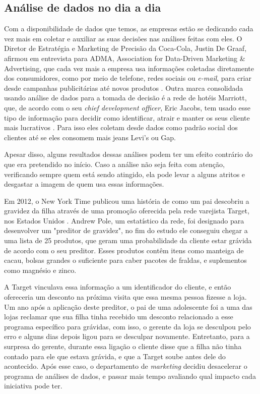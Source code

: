 \subsection{Análise de dados no dia a dia}

\indent
\par Com a disponibilidade de dados que temos, as empresas estão se dedicando cada vez mais em coletar e auxiliar as suas decisões nas análises feitas com eles. O Diretor de Estratégia e Marketing de Precisão da Coca-Cola, Justin De Graaf, afirmou em entrevista para ADMA, Association for Data-Driven Marketing \& Advertising, que cada vez mais a empresa usa informações coletadas diretamente dos consumidores, como por meio de telefone, redes sociais ou \textit{e-mail}, para criar desde campanhas publicitárias até novos produtos \cite{Tan2017}. Outra marca consolidada usando análise de dados para a tomada de decisão é a rede de hotéis Marriott, que, de acordo com o seu \textit{chief development officer}, Eric Jacobs, tem usado esse tipo de informação para decidir como identificar, atrair e manter os seus cliente mais lucrativos \cite{Eisen2018}. Para isso eles coletam desde dados como padrão social dos clientes até se eles consomem mais jeans Levi's ou Gap.

\par Apesar disso, alguns resultados dessas análises podem ter um efeito contrário do que era pretendido no início. Caso a análise não seja feita com atenção, verificando sempre quem está sendo atingido, ela pode levar a alguns atritos e desgastar a imagem de quem usa essas informações.

\par Em 2012, o New York Time publicou uma história de como um pai descobriu a gravidez da filha através de uma promoção oferecida pela rede varejista Target, nos Estados Unidos \cite{Duhigg2012}. Andrew Pole, um estatístico da rede, foi designado para desenvolver um "preditor de gravidez", no fim do estudo ele conseguiu chegar a uma lista de 25 produtos, que geram uma probabilidade da cliente estar grávida de acordo com o seu preditor. Esses produtos contêm itens como manteiga de cacau, bolsas grandes o suficiente para caber pacotes de fraldas, e suplementos como magnésio e zinco.

\par A Target vinculava essa informação a um identificador do cliente, e então ofereceria um desconto na próxima visita que essa mesma pessoa fizesse a loja. Um ano após a aplicação deste preditor, o pai de uma adolescente foi a uma das lojas reclamar que sua filha tinha recebido um desconto relacionado a esse programa específico para grávidas, com isso, o gerente da loja se desculpou pelo erro e alguns dias depois ligou para se desculpar novamente. Entretanto, para a surpresa do gerente, durante essa ligação o cliente disse que a filha não tinha contado para ele que estava grávida, e que a Target soube antes dele do acontecido. Após esse caso, o departamento de \textit{marketing} decidiu desacelerar o programa de análises de dados, e passar mais tempo avaliando qual impacto cada iniciativa pode ter.
